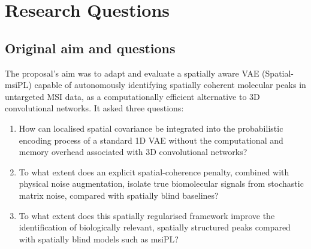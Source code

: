 \section{Research Questions}
\label{sec:questions}

\subsection{Original aim and questions}
The proposal's aim was to adapt and evaluate a spatially aware VAE
(Spatial-msiPL) capable of autonomously identifying spatially coherent
molecular peaks in untargeted MSI data, as a computationally efficient
alternative to 3D convolutional networks. It asked three questions:
\begin{enumerate}[label=P\arabic*.]
  \item How can localised spatial covariance be integrated into the
        probabilistic encoding process of a standard 1D VAE without the
        computational and memory overhead associated with 3D convolutional
        networks?
  \item To what extent does an explicit spatial-coherence penalty, combined
        with physical noise augmentation, isolate true biomolecular signals
        from stochastic matrix noise, compared with spatially blind baselines?
  \item To what extent does this spatially regularised framework improve the
        identification of biologically relevant, spatially structured peaks
        compared with spatially blind models such as msiPL?
\end{enumerate}

